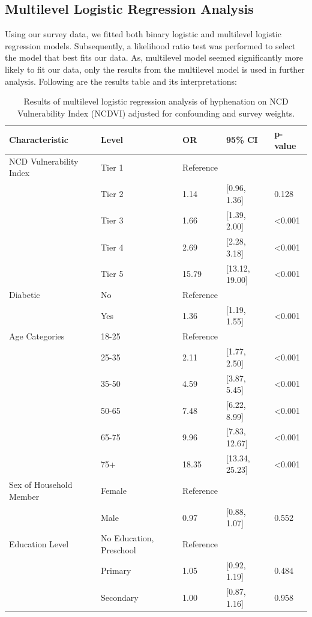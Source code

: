 \documentclass[
  12pt,
  a4paper]{article}
\begin{document}
\subsection{Multilevel Logistic Regression Analysis}\label{multilevel-logistic-regression-analysis}

Using our survey data, we fitted both binary logistic and multilevel logistic regression models. Subsequently, a likelihood ratio test was performed to select the model that best fits our data. As, multilevel model seemed significantly more likely to fit our data, only the results from the multilevel model is used in further analysis. Following are the results table and its interpretations:

\begin{longtable}[t]{lllll}
\caption{\label{tab:multitab}Results of multilevel logistic regression analysis of hyphenation on NCD Vulnerability Index (NCDVI) adjusted for confounding and survey weights.}\\
\toprule
Characteristic & Level & OR & 95\% CI & p-value\\
\midrule
NCD Vulnerability Index & Tier 1 & Reference &  & \\
 & Tier 2 & 1.14 & {}[0.96, 1.36] & 0.128\\
 & Tier 3 & 1.66 & {}[1.39, 2.00] & <0.001\\
 & Tier 4 & 2.69 & {}[2.28, 3.18] & <0.001\\
 & Tier 5 & 15.79 & {}[13.12, 19.00] & <0.001\\
Diabetic & No & Reference &  & \\
 & Yes & 1.36 & {}[1.19, 1.55] & <0.001\\
Age Categories & 18-25 & Reference &  & \\
 & 25-35 & 2.11 & {}[1.77, 2.50] & <0.001\\
 & 35-50 & 4.59 & {}[3.87, 5.45] & <0.001\\
 & 50-65 & 7.48 & {}[6.22, 8.99] & <0.001\\
 & 65-75 & 9.96 & {}[7.83, 12.67] & <0.001\\
 & 75+ & 18.35 & {}[13.34, 25.23] & <0.001\\
Sex of Household Member & Female & Reference &  & \\
 & Male & 0.97 & {}[0.88, 1.07] & 0.552\\
Education Level & No Education, Preschool & Reference &  & \\
 & Primary & 1.05 & {}[0.92, 1.19] & 0.484\\
 & Secondary & 1.00 & {}[0.87, 1.16] & 0.958\\

\end{longtable}
\end{document}
